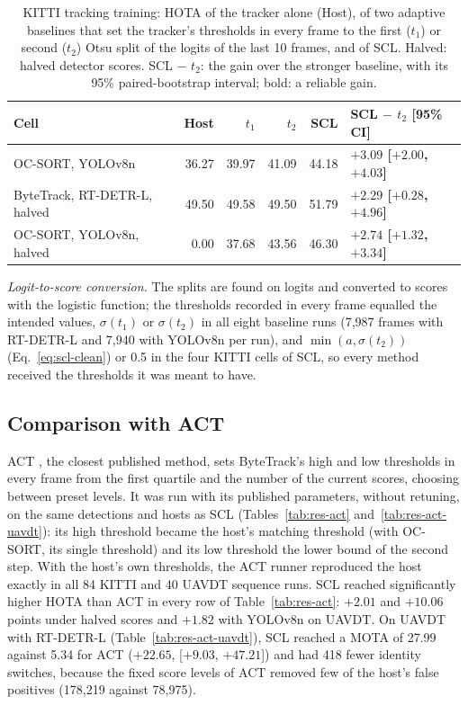 \begin{table}[tbp]
\centering
\caption{KITTI tracking training: HOTA of the tracker alone (Host), of two adaptive baselines that set the tracker's thresholds in every frame to the first ($t_1$) or second ($t_2$) Otsu split of the logits of the last 10 frames, and of SCL. Halved: halved detector scores. SCL $-$ $t_2$: the gain over the stronger baseline, with its 95\% paired-bootstrap interval; bold: a reliable gain.}
\label{tab:res-baselines}
\begin{tabular}{lrrrrl}
\toprule
Cell & Host & $t_1$ & $t_2$ & SCL & SCL $-$ $t_2$ [95\% CI]\\
\midrule
OC-SORT, YOLOv8n & 36.27 & 39.97 & 41.09 & 44.18 & \textbf{$+3.09$ [$+2.00$, $+4.03$]}\\
ByteTrack, RT-DETR-L, halved & 49.50 & 49.58 & 49.50 & 51.79 & \textbf{$+2.29$ [$+0.28$, $+4.96$]}\\
OC-SORT, YOLOv8n, halved & 0.00 & 37.68 & 43.56 & 46.30 & \textbf{$+2.74$ [$+1.32$, $+3.34$]}\\
\bottomrule
\end{tabular}
\end{table}

\emph{Logit-to-score conversion.} The splits are found on logits and converted to scores with the logistic function; the thresholds recorded in every frame equalled the intended values, $\sigma(t_1)$ or $\sigma(t_2)$ in all eight baseline runs (7,987 frames with RT-DETR-L and 7,940 with YOLOv8n per run), and $\min(a,\sigma(t_2))$ (Eq.~\eqref{eq:scl-clean}) or 0.5 in the four KITTI cells of SCL, so every method received the thresholds it was meant to have.

\subsection{Comparison with ACT}\label{sec:res-act}
ACT \cite{act2026adaptive}, the closest published method, sets ByteTrack's high and low thresholds in every frame from the first quartile and the number of the current scores, choosing between preset levels. It was run with its published parameters, without retuning, on the same detections and hosts as SCL (Tables~\ref{tab:res-act} and~\ref{tab:res-act-uavdt}): its high threshold became the host's matching threshold (with OC-SORT, its single threshold) and its low threshold the lower bound of the second step. With the host's own thresholds, the ACT runner reproduced the host exactly in all 84 KITTI and 40 UAVDT sequence runs. SCL reached significantly higher HOTA than ACT in every row of Table~\ref{tab:res-act}: $+2.01$ and $+10.06$ points under halved scores and $+1.82$ with YOLOv8n on UAVDT. On UAVDT with RT-DETR-L (Table~\ref{tab:res-act-uavdt}), SCL reached a MOTA of 27.99 against 5.34 for ACT ($+22.65$, [$+9.03$, $+47.21$]) and had 418 fewer identity switches, because the fixed score levels of ACT removed few of the host's false positives (178,219 against 78,975).

